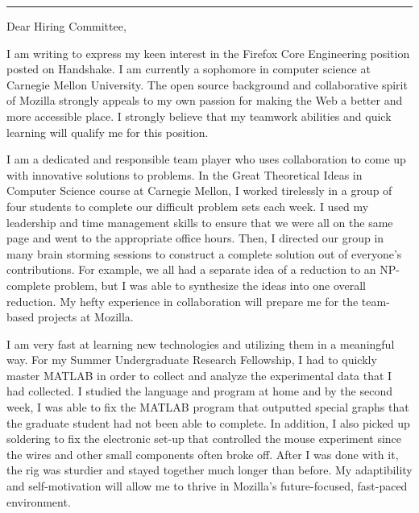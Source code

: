 \documentclass{kindofneat}
\begin{document}


\noindent\rule{\textwidth}{1pt}

\Large

\noindent Dear Hiring Committee,

\vspace*{1em}

I am writing to express my keen interest in the Firefox Core Engineering position posted on Handshake. I am currently a sophomore in computer science at Carnegie Mellon University. The open source background and collaborative spirit of Mozilla strongly appeals to my own passion for making the Web a better and more accessible place. I strongly believe that my teamwork abilities and quick learning will qualify me for this position.

\vspace*{0.5em}

I am a dedicated and responsible team player who uses collaboration to come up with innovative solutions to problems. In the Great Theoretical Ideas in Computer Science course at Carnegie Mellon, I worked tirelessly in a group of four students to complete our difficult problem sets each week. I used my leadership and time management skills to ensure that we were all on the same page and went to the appropriate office hours. Then, I directed our group in many brain storming sessions to construct a complete solution out of everyone's contributions. For example, we all had a separate idea of a reduction to an NP-complete problem, but I was able to synthesize the ideas into one overall reduction. My hefty experience in collaboration will prepare me for the team-based projects at Mozilla. 

\vspace*{0.5em}
I am very fast at learning new technologies and utilizing them in a meaningful way. For my Summer Undergraduate Research Fellowship, I had to quickly master MATLAB in order to collect and analyze the experimental data that I had collected. I studied the language and program at home and by the second week, I was able to fix the MATLAB program that outputted special graphs that the graduate student had not been able to complete. In addition, I also picked up soldering to fix the electronic set-up that controlled the mouse experiment since the wires and other small components often broke off. After I was done with it, the rig was sturdier and stayed together much longer than before. My adaptibility and self-motivation will allow me to thrive in Mozilla's future-focused, fast-paced environment. 
\vspace*{0.5em}
\end{document}
